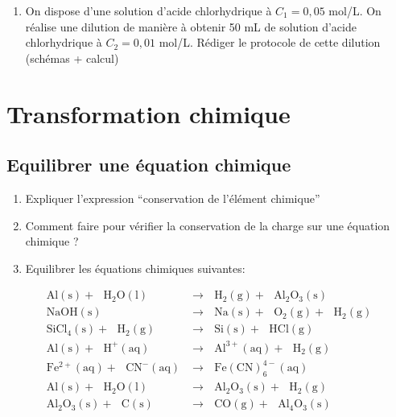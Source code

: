 \documentclass[
]{book}
\providecommand{\tightlist}{%
  \setlength{\itemsep}{0pt}\setlength{\parskip}{0pt}}
\def\tightlist{}
\begin{document}
\begin{enumerate}
\def\labelenumi{\arabic{enumi}.}
\setcounter{enumi}{1}
\tightlist
\item
  On dispose d'une solution d'acide chlorhydrique à \(C_1= 0,05\) mol/L. On réalise une dilution de manière à obtenir 50 mL de solution d'acide chlorhydrique à \(C_2= 0,01\) mol/L. Rédiger le protocole de cette dilution (schémas + calcul)
\end{enumerate}

\hypertarget{transformation-chimique}{%
\section{Transformation chimique}\label{transformation-chimique}}

\hypertarget{equilibrer-une-uxe9quation-chimique}{%
\subsection{Equilibrer une équation chimique}\label{equilibrer-une-uxe9quation-chimique}}

\begin{enumerate}
\def\labelenumi{\arabic{enumi}.}
\tightlist
\item
  Expliquer l'expression ``conservation de l'élément chimique''
\item
  Comment faire pour vérifier la conservation de la charge sur une équation chimique ?
\item
  Equilibrer les équations chimiques suivantes:
\end{enumerate}

\begin{align}
\mathrm{Al(s)+\ \ \ H_2O(l)}&\longrightarrow \ \ \ \mathrm{H_2(g)+ \ \ \ Al_2O_3(s)}\\
\mathrm{NaOH(s)}&\longrightarrow \ \ \ \mathrm{Na(s)+\ \ \ O_2(g)+\ \ \ H_2(g)}\\
\mathrm{SiCl_4(s)+\ \ \ H_2(g)}&\longrightarrow \ \ \ \mathrm{ Si(s)+\ \ \ HCl(g)}\\
\mathrm{Al(s)+\ \ \ H^+(aq)}&\longrightarrow \ \ \ \mathrm{Al^{3+}(aq)+\ \ \ H_2(g)}\\
\mathrm{Fe^{2+}(aq)+\ \ \ CN^-(aq)}&\longrightarrow \ \ \ \mathrm{Fe(CN)_6^{4-}(aq)}\\
\mathrm{Al(s)+\ \ \ H_2O(l)}&\longrightarrow \ \ \ \mathrm{Al_2O_3(s)+\ \ \ H_2(g)}\\
\mathrm{Al_2O_3(s)+\ \ \ C(s)}&\longrightarrow \ \ \ \mathrm{CO(g)+\ \ \ Al_4O_3(s)}
\end{align}
\end{document}
